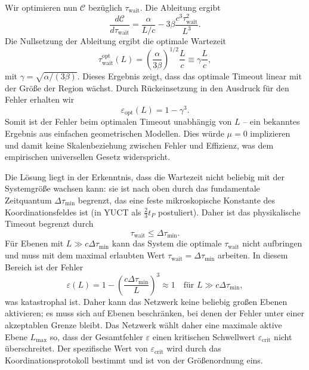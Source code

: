\documentclass[11pt,a4paper]{article}
\begin{document}
	Wir optimieren nun \(\mathcal{C}\) bezüglich \(\tau_{\mathrm{wait}}\). Die Ableitung ergibt
	\[
	\frac{d\mathcal{C}}{d\tau_{\mathrm{wait}}} = \frac{\alpha}{L/c} - 3\beta \frac{c^3\tau_{\mathrm{wait}}^2}{L^3}.
	\]
	Die Nullsetzung der Ableitung ergibt die optimale Wartezeit
	\[
	\tau_{\mathrm{wait}}^{\mathrm{opt}}(L) = \left(\frac{\alpha}{3\beta}\right)^{1/2} \frac{L}{c} \equiv \gamma \frac{L}{c},
	\]
	mit \(\gamma = \sqrt{\alpha/(3\beta)}\). Dieses Ergebnis zeigt, dass das optimale Timeout linear mit der Größe der Region wächst. Durch Rückeinsetzung in den Ausdruck für den Fehler erhalten wir
	\[
	\varepsilon_{\mathrm{opt}}(L) = 1 - \gamma^3.
	\]
	Somit ist der Fehler beim optimalen Timeout unabhängig von \(L\) – ein bekanntes Ergebnis aus einfachen geometrischen Modellen. Dies würde \(\mu = 0\) implizieren und damit keine Skalenbeziehung zwischen Fehler und Effizienz, was dem empirischen universellen Gesetz widerspricht.
	
	Die Lösung liegt in der Erkenntnis, dass die Wartezeit nicht beliebig mit der Systemgröße wachsen kann: sie ist nach oben durch das fundamentale Zeitquantum \(\Delta\tau_{\min}\) begrenzt, das eine feste mikroskopische Konstante des Koordinationsfeldes ist (in YUCT als \(\frac23 t_P\) postuliert). Daher ist das physikalische Timeout begrenzt durch
	\[
	\tau_{\mathrm{wait}} \le \Delta\tau_{\min}.
	\]
	Für Ebenen mit \(L \gg c\Delta\tau_{\min}\) kann das System die optimale \(\tau_{\mathrm{wait}}\) nicht aufbringen und muss mit dem maximal erlaubten Wert \(\tau_{\mathrm{wait}} = \Delta\tau_{\min}\) arbeiten. In diesem Bereich ist der Fehler
	\[
	\varepsilon(L) = 1 - \left(\frac{c\Delta\tau_{\min}}{L}\right)^3 \approx 1 \quad\text{für } L \gg c\Delta\tau_{\min},
	\]
	was katastrophal ist. Daher kann das Netzwerk keine beliebig großen Ebenen aktivieren; es muss sich auf Ebenen beschränken, bei denen der Fehler unter einer akzeptablen Grenze bleibt. Das Netzwerk wählt daher eine maximale aktive Ebene \(L_{\max}\) so, dass der Gesamtfehler \(\varepsilon\) einen kritischen Schwellwert \(\varepsilon_{\mathrm{crit}}\) nicht überschreitet. Der spezifische Wert von \(\varepsilon_{\mathrm{crit}}\) wird durch das Koordinationsprotokoll bestimmt und ist von der Größenordnung eins.
	
\end{document}

